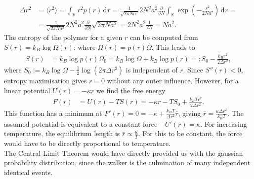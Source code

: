 \documentclass[english, parskip=full]{scrartcl}
\renewcommand{\bra}{}
\newcommand{\intr}{}
\newcommand{\kla}{}
\newcommand{\e}{\text{e}}
\begin{document}
\begin{align}
\Delta r^2 &= \bra\langle r^2 \rangle = \intr\int_{\mathbb{R}^{ }} r^2p(r) \, \mathrm{d}^{ }r = \frac{1}{\sqrt{2\pi Na^2}} 2N^2a^2 \frac{\partial}{\partial N} \intr\int_{\mathbb{R}^{ }} \exp\kla\left( -\frac{r^2}{2Na^2} \right) \, \mathrm{d}^{ }r = \\
&= \frac{1}{\sqrt{2\pi Na^2}} 2N^2a^2 \frac{\partial}{\partial N} \sqrt{2\pi Na^2} = 2N^2a^2 \frac{1}{2N} = Na^2.
\end{align}
The entropy of the polymer for a given $r$ can be computed from $S(r) = k_B\log \Omega(r)$, where $\Omega(r) = p(r)\Omega$.
This leads to 
\begin{align}
S(r) &= k_B\log p(r)\Omega_0 = k_B\log\Omega + k_B\log p(r) =: S_0 - \frac{k_Br^2}{2\Delta r^2},
\end{align}
where $S_0 := k_B\log\Omega - \frac{1}{2}\log\kla\left( 2\pi\Delta r^2 \right)$ is independent of $r$.
Since $S''(r)<0$, entropy maximisation gives $r=0$ without any outer influence.
However, for a linear potential $U(r) = -\kappa r$ we find the free energy
\begin{align}
F(r) &= U(r) - TS(r) = -\kappa r - TS_0 + \frac{k_BTr^2}{2\Delta r^2}.
\end{align}
This function has a minimum at $F'(r) = 0 = -\kappa + \frac{k_BT}{\Delta r^2} \bar{r}$, giving $\bar{r}=\frac{\kappa \Delta r^2}{k_BT}$.
The assumed potential is equivalent to a constant force $-U'(r) = \kappa$.
For increasing temperature, the equilibrium length is $\bar{r} \propto \frac{\kappa}{T}$.
For this to be constant, the force would have to be directly proportional to temperature.
\\
The Central Limit Theorem would have directly provided us with the gaussian probability distribution, since the walker is the culmination of many independent identical events.

\end{document}
